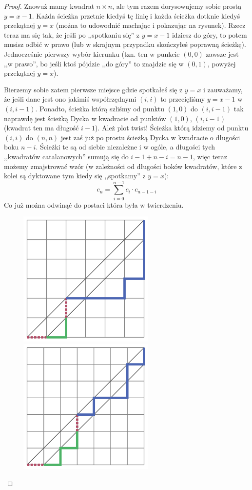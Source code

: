 \begin{proof}
	Znowuż mamy kwadrat $n \times n$, ale tym razem dorysowujemy sobie prostą $y = x - 1$. Każda ścieżka przetnie kiedyś tę linię i każda ścieżka dotknie kiedyś przekątnej $y = x$ (można to udowodnić machając i pokazując na rysunek). Rzecz teraz ma się tak, że jeśli po ,,spotkaniu się'' z $y = x - 1$ idziesz do góry, to potem musisz odbić w prawo (lub w skrajnym przypadku skończyłeś poprawną ścieżkę). Jednocześnie pierwszy wybór kierunku (tzn. ten w punkcie $(0,0)$ zawsze jest ,,w prawo'', bo jeśli ktoś pójdzie ,,do góry'' to znajdzie się w $(0,1)$, powyżej przekątnej $y = x$).

	Bierzemy sobie zatem pierwsze miejsce gdzie spotkałeś się z $y = x$ i zauważamy, że jeśli dane jest ono jakimiś współrzędnymi $(i,i)$ to przecięliśmy $y = x-1$ w $(i,i-1)$. Ponadto, ścieżka którą szliśmy od punktu $(1,0)$ do $(i,i-1)$ tak naprawdę jest ścieżką Dycka w kwadracie od punktów $(1,0)$, $(i, i-1)$ (kwadrat ten ma długość $i-1$). Ależ plot twist! Ścieżka którą idziemy od punktu $(i,i)$ do $(n,n)$ jest zaś już po prostu ścieżką Dycka w kwadracie o długości boku $n-i$. Ścieżki te są od siebie niezależne i w ogóle, a długości tych ,,kwadratów catalanowych'' sumują się do $i - 1 + n - i = n - 1$, więc teraz możemy zmajstrować wzór (w zależności od długości boków kwadratów, które z kolei są dyktowane tym kiedy się ,,spotkamy'' z $y = x$):
	\begin{equation*}
		c_n = \sum_{i = 0}^{n-1} c_i \cdot c_{n-1-i}
	\end{equation*}
	Co już można odwinąć do postaci która była w twierdzeniu.

	\begin{figure}[H]
		\centering
		\includegraphics[scale=0.5]{images/catalan/recursive_construction_1.png}
		\includegraphics[scale=0.5]{images/catalan/recursive_construction_2.png}


\end{figure}
\end{proof}
